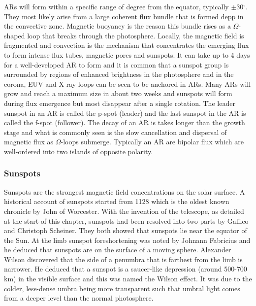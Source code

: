 	ARs will form within a specific range of degree from the equator, typically $\pm$30$^\circ$.
	They most likely arise from a large coherent flux bundle that is formed depp in the convective zone.
	Magnetic buoyancy is the reason this bundle rises as a $\Omega$-shaped loop that breaks through the photosphere.
	Locally, the magnetic field is fragmented and convection is the mechanism that concentrates the emerging flux to form intense flux tubes, magnetic pores and sunspots.
	It can take up to 4 days for a well-developed AR to form and it is common that a sunspot group is surrounded by regions of enhanced brightness in the photosphere and in the corona, EUV and X-ray loops can be seen to be anchored in ARs.
	Many ARs will grow and reach a maximum size in about two weeks and sunspots will form during flux emergence but most disappear after a single rotation.
	The leader sunspot in an AR is called the p-spot (leader) and the last sunspot in the AR is called the f-spot (follower).
	The decay of an AR is takes longer than the growth stage and what is commonly seen is the slow cancellation and dispersal of magnetic flux as $\Omega$-loops submerge.
	Typically an AR are bipolar flux which are well-ordered into two islands of opposite polarity.
	
\subsubsection{Sunspots}

    Sunspots are the strongest magnetic field concentrations on the solar surface.
    A historical account of sunspots started from 1128 which is the oldest known chronicle by John of Worcester.
    With the invention of the telescope, as detailed at the start of this chapter, sunspots had been resolved into two parts by Galileo and Christoph Scheiner.
    They both showed that sunspots lie near the equator of the Sun.
    At the limb sunspot foreshortening was noted by Johnann Fabricius and he deduced that sunspots are on the surface of a moving sphere. 
    Alexander Wilson discovered that the side of a penumbra that is farthest from the limb is narrower.
    He deduced that a sunspot is a saucer-like depression (around 500-700 km) in the visible surface and this was named the Wilson effect.
    It was due to the colder, less-dense umbra being more transparent such that umbral light comes from a deeper level than the normal photosphere.

